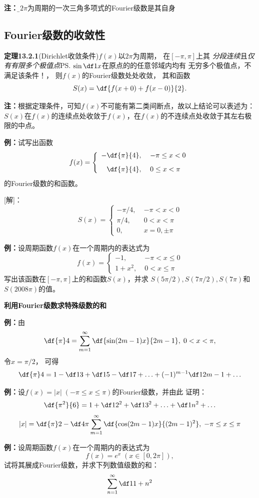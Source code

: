 {\bf 注：}{\b 以$2\pi$为周期的一次三角多项式的Fourier级数是其自身}

\subsection{Fourier级数的收敛性}

{\bf 定理13.2.1}(Dirichlet收敛条件)$f(x)$以$2\pi$为周期， 在$[-\pi,\pi]$上其
{\it 分段连续}且{\it 仅有有限多个极值点}\ps{$\sin\df1x$在原点的的任意邻域内均有
无穷多个极值点，不满足该条件！}， 
则$f(x)$的Fourier级数处处收敛，
 其和函数
$$S(x) =\df{f(x+0)+f(x-0)}{2}.$$

{\bf 注：}根据定理条件，可知$f(x)$不可能有第二类间断点，故以上结论可以表述为：
$S(x)$在$f(x)$的连续点处收敛于$f(x)$，在$f(x)$的不连续点处收敛于其左右极限的中点。

{\bf 例：}试写出函数
$$f(x)=\left\{\begin{array}{rl}
	-\df{\pi}{4},\; & -\pi\leq x<0\\[8pt]
	\df{\pi}{4},\; & 0\leq x<\pi
\end{array}\right.$$
的Fourier级数的和函数。

[解]：
$${S(x)=\left\{\begin{array}{ll}
	-\pi/4,\;& -\pi<x<0\\
	\pi/4,\;& 0<x<\pi\\
	0,\; & x=0,\pm\pi
\end{array}\right.}$$

{\bf 例：}设周期函数$f(x)$在一个周期内的表达式为
$$f(x)=\left\{\begin{array}{ll}
	-1,\;& -\pi<x\leq 0\\
	1+x^2,\; & 0<x\leq\pi
\end{array}\right.$$
写出该函数在$[-\pi,\pi]$上的和函数$S(x)$，并求
$S(5\pi/2),S(7\pi/2),S(7\pi)$和$S(2008\pi)$的值。

{\bf 利用Fourier级数求特殊级数的和}

{\bf 例：}由
$$\df{\pi}4=\sum\limits_{m=1}^{\infty}
\df{\sin(2m-1)x}{2m-1},\;0<x<\pi,$$
 令$x=\pi/2$， 可得
$$\df{\pi}4=1-\df 13+\df 15-\df 17+\ldots
+(-1)^{m-1}\df 1{2m-1}+\ldots$$

{\bf 例：}设$f(x)=|x|\;(-\pi\leq x\leq \pi)$的Fourier级数，并由此
证明：
$$\df{\pi^2}{6}=1+\df 1{2^2}+\df 1{3^2}+\ldots+\df 1{n^2}+\ldots$$
$${|x|=\df{\pi}2-\df 4{\pi}\sum\limits_{m=1}^{\infty} 
\df{\cos(2m-1)x}{(2m-1)^2},\;-\pi\leq x\leq \pi}$$

{\bf 例：}设周期函数$f(x)$在一个周期内的表达式为
$$f(x)=e^x\;(x\in[0,2\pi]),$$
试将其展成Fourier级数，并求下列数值级数的和：
$$\sum\limits_{n=1}^{\infty}\df1{1+n^2}$$

